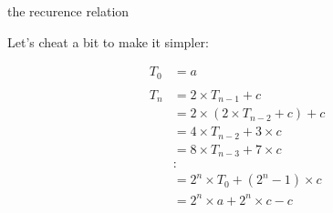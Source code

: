 \begin{frame}{the recurence relation}

  Let's cheat a bit to make it simpler:

  \vspace{5pt}\pause

    \begin{equation}  
  \begin{split}
    T_0 & = a \\
    \\
T_n & = 2 \times T_{n-1} + c \\
    & = 2 \times ( 2 \times T_{n-2} + c ) + c \\
    & = 4 \times T_{n-2} + 3 \times c \\
    & = 8 \times T_{n-3} + 7 \times c\\
    & : \\
    & = 2^n \times T_0 +  (2^n -1) \times c \\
    & = 2^n \times a +  2^n \times c  - c\\
  \end{split}
\end{equation}

\vspace{5pt}


\end{frame}


